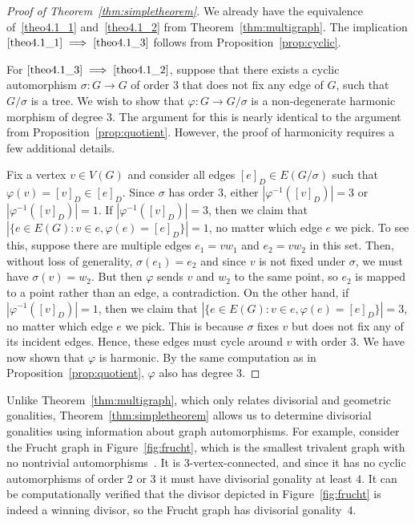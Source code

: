 \documentclass[ALCO,ThmDefs,Unicode,epreuves]{cedram}
\begin{document}
\begin{proof}[Proof of Theorem~\ref{thm:simpletheorem}]
We already have the equivalence of~\eqref{theo4.1_1} and~\eqref{theo4.1_2} from Theorem~\ref{thm:multigraph}. 
The implication $\eqref{theo4.1_1} \implies \eqref{theo4.1_3}$ follows from Proposition~\ref{prop:cyclic}.

For $\eqref{theo4.1_3} \implies \eqref{theo4.1_2}$, suppose that there exists a cyclic automorphism $\sigma:G\rightarrow G$ of order $3$ that does not fix any edge of $G$, such that $G/\sigma$ is a tree. We wish to show that $\varphi : G \to G/\sigma$ is a non-degenerate harmonic morphism of degree $3$. The argument for this is nearly identical to the argument from Proposition~\ref{prop:quotient}. However, the proof of harmonicity requires a few additional details. 

Fix a vertex $v \in V(G)$ and consider all edges $[e]_{D} \in E(G/\sigma)$ such that $\varphi(v) = [v]_{D} \in [e]_{D}$. Since $\sigma$ has order $3$, either $|\varphi^{-1}([v]_{D})|=3$ or $|\varphi^{-1}([v]_{D})|=1$. If $|\varphi^{-1}([v]_{D})|=3$, then we claim that $| \{e \in E(G) : v \in e, \varphi(e) = [e]_{D} \}| = 1$, no matter which edge $e$ we pick. To see this, suppose there are multiple edges $e_1=vw_1$ and $e_2=vw_2$ in this set. Then, without loss of generality, $\sigma(e_1) = e_2$ and since $v$ is not fixed under $\sigma$, we must have $\sigma(v) = w_2$. But then $\varphi$ sends $v$ and $w_2$ to the same point, so $e_2$ is mapped to a point rather than an edge, a contradiction. On the other hand, if $|\varphi^{-1}([v]_{D})|=1$, then we claim that $| \{e \in E(G) : v \in e, \varphi(e) = [e]_{D} \}| = 3$, no matter which edge $e$ we pick. This is because $\sigma$ fixes $v$ but does not fix any of its incident edges. Hence, these edges must cycle around $v$ with order $3$. We have now shown that $\varphi$ is harmonic. By the same computation as in Proposition~\ref{prop:quotient}, $\varphi$ also has degree $3$. 
\end{proof}



Unlike Theorem~\ref{thm:multigraph}, which only relates divisorial and geometric gonalities, Theorem~\ref{thm:simpletheorem} allows us to determine divisorial gonalities using information about graph automorphisms. For example, consider the Frucht graph in Figure~\ref{fig:frucht}, which is the smallest trivalent graph with no nontrivial automorphisms~\cite{frucht}. It is $3$-vertex-connected, and since it has no cyclic automorphisms of order $2$ or $3$ it must have divisorial gonality at least $4$. It can be computationally verified that the divisor depicted in Figure~\ref{fig:frucht} is indeed a winning divisor, so the Frucht graph has divisorial gonality~$4$.
\end{document}
